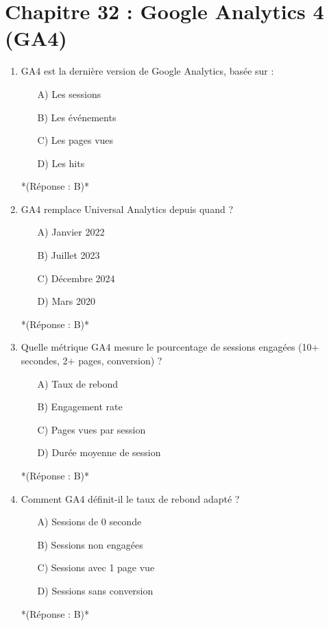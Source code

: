 \documentclass[12pt,a4paper,twoside]{report}
\begin{document}
\section*{Chapitre 32 : Google Analytics 4 (GA4)}
\begin{enumerate}
    \item GA4 est la dernière version de Google Analytics, basée sur :
    \begin{itemize}
        \item[A)] Les sessions
        \item[B)] Les événements
        \item[C)] Les pages vues
        \item[D)] Les hits
    \end{itemize}
    *(Réponse : B)*

    \item GA4 remplace Universal Analytics depuis quand ?
    \begin{itemize}
        \item[A)] Janvier 2022
        \item[B)] Juillet 2023
        \item[C)] Décembre 2024
        \item[D)] Mars 2020
    \end{itemize}
    *(Réponse : B)*

    \item Quelle métrique GA4 mesure le pourcentage de sessions engagées (10+ secondes, 2+ pages, conversion) ?
    \begin{itemize}
        \item[A)] Taux de rebond
        \item[B)] Engagement rate
        \item[C)] Pages vues par session
        \item[D)] Durée moyenne de session
    \end{itemize}
    *(Réponse : B)*

    \item Comment GA4 définit-il le taux de rebond adapté ?
    \begin{itemize}
        \item[A)] Sessions de 0 seconde
        \item[B)] Sessions non engagées
        \item[C)] Sessions avec 1 page vue
        \item[D)] Sessions sans conversion
    \end{itemize}
    *(Réponse : B)*


\end{enumerate}
\end{document}
